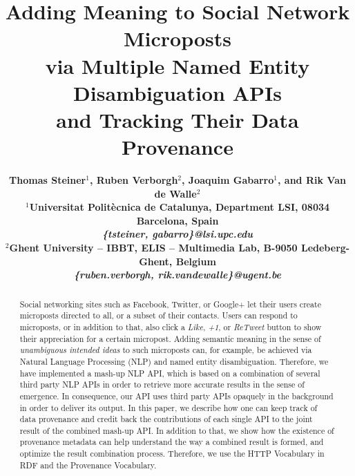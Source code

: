 \documentclass[twocolumn]{article}
\begin{document}
\pagestyle{empty}
\sloppy


\title{Adding Meaning to Social Network Microposts\\ via Multiple Named Entity Disambiguation APIs\\ and Tracking Their Data Provenance}

\author{\bf Thomas Steiner$^1$, Ruben Verborgh$^2$, Joaquim Gabarro$^1$, and Rik Van de Walle$^2$\\[1em]
$^1$Universitat Polit\`ecnica de Catalunya,
Department LSI,
08034 Barcelona, Spain\\
\textit{\{tsteiner, gabarro\}@lsi.upc.edu}\\[1em]
$^2$Ghent University -- IBBT,
ELIS -- Multimedia Lab,
B-9050 Ledeberg-Ghent, Belgium\\
\textit{\{ruben.verborgh, rik.vandewalle\}@ugent.be}}

\maketitle

\begin{abstract}
Social networking sites such as Facebook, Twitter, or Google+ let their users  create microposts directed to all, or a subset of their contacts. Users can respond to microposts, or in addition to that, also click a \textit{Like}, \textit{+1}, or \textit{ReTweet} button to show their appreciation for a certain micropost. Adding semantic meaning in the sense of \emph{unambiguous intended ideas} to such microposts can, for example, be achieved via Natural Language Processing (NLP) and named entity disambiguation. Therefore, we have implemented a mash-up NLP API, which is based on a combination of several third party NLP APIs in order to retrieve more accurate results in the sense of emergence. In consequence, our API uses third party APIs opaquely in the background in order to deliver its output. In this paper, we describe how one can keep track of data provenance and credit back the contributions of each single API to the joint result of the combined mash-up API. In addition to that, we show how the existence of provenance metadata can help understand the way a combined result is formed, and optimize the result combination process. Therefore, we use the HTTP Vocabulary in RDF and the Provenance Vocabulary.
\end{abstract}

\end{document}
